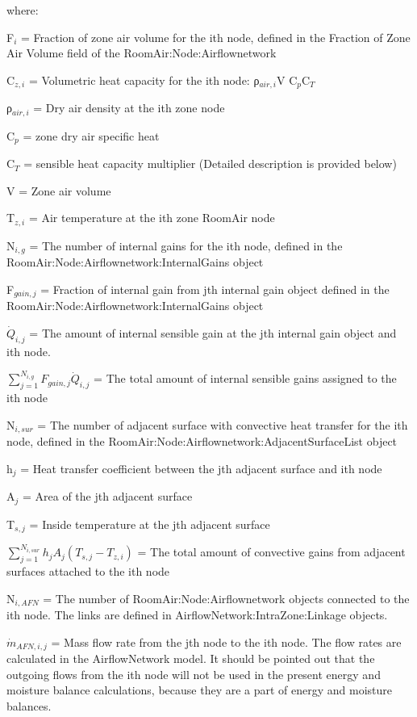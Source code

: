 {where:

F\(_{i}\) = Fraction of zone air volume for the ith node, defined in the Fraction of Zone Air Volume field of the RoomAir:Node:Airflownetwork

C\(_{z,i}\) = Volumetric heat capacity for the ith node: ρ\(_{air,i}\)V C\(_{p}\)C\(_{T}\)

ρ\(_{air,i}\) = Dry air density at the ith zone node

C\(_{p}\) = zone dry air specific heat

C\(_{T}\) = sensible heat capacity multiplier (Detailed description is provided below)

V = Zone air volume

T\(_{z,i}\) = Air temperature at the ith zone RoomAir node

N\(_{i,g}\) = The number of internal gains for the ith node, defined in the RoomAir:Node:Airflownetwork:InternalGains object

F\(_{gain,j}\) = Fraction of internal gain from jth internal gain object defined in the RoomAir:Node:Airflownetwork:InternalGains object

\({\dot Q}_{i,j}\) = The amount of internal sensible gain at the jth internal gain object and ith node.

\({\sum\limits_{j = 1}^{N_{i,g}} F_{gain,j}{\dot Q}_{i,j}}\) = The total amount of internal sensible gains assigned to the ith node

N\(_{i,sur}\) = The number of adjacent surface with convective heat transfer for the ith node, defined in the RoomAir:Node:Airflownetwork:AdjacentSurfaceList object

h\(_{j}\) = Heat transfer coefficient between the jth adjacent surface and ith node

A\(_{j}\) = Area of the jth adjacent surface

T\(_{s,j}\) = Inside temperature at the jth adjacent surface

\({\sum\limits_{j = 1}^{N_{i,sur}} h_{j} A_j \left( T_{s,j} - T_{z,i}\right)}\) = The total amount of convective gains from adjacent surfaces attached to the ith node

N\(_{i,AFN}\) = The number of RoomAir:Node:Airflownetwork objects connected to the ith node. The links are defined in AirflowNetwork:IntraZone:Linkage objects.

\({\dot m}_{AFN,i,j}\) = Mass flow rate from the jth node to the ith node. The flow rates are calculated in the AirflowNetwork model. It should be pointed out that the outgoing flows from the ith node will not be used in the present energy and moisture balance calculations, because they are a part of energy and moisture balances.

}
